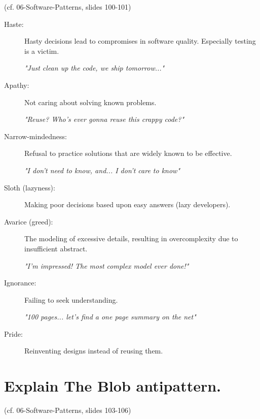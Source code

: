 (cf. 06-Software-Patterns, slides 100-101)\\

\begin{description}
\item[Haste:]

	Hasty decisions lead to compromises in software quality. Especially testing is a victim.

	\textit{"Just clean up the code, we ship tomorrow..."}
    
\item[Apathy:]

	Not caring about solving known problems.

	\textit{"Reuse? Who's ever gonna reuse this crappy code?"}

\item[Narrow-mindedness:]

	Refusal to practice solutions that are widely known to be effective.

	\textit{"I don't need to know, and... I don't care to know"}

\item[Sloth (lazyness):]

	Making poor decisions based upon easy answers (lazy developers).

\item[Avarice (greed):]

	The modeling of excessive details, resulting in overcomplexity due to insufficient abstract.

	\textit{"I'm impressed! The most complex model ever done!"}

\item[Ignorance:]

	Failing to seek understanding.

	\textit{"100 pages... let's find a one page summary on the net"}

\item[Pride:]
	
	Reinventing designs instead of reusing them.
\end{description}

\section{Explain The Blob antipattern.}

(cf. 06-Software-Patterns, slides 103-106)\\

